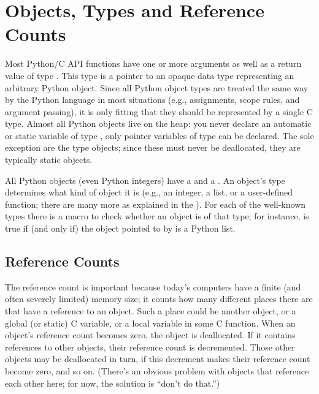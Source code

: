 \documentclass{manual}
\begin{document}
\section{Objects, Types and Reference Counts \label{objects}}

Most Python/C API functions have one or more arguments as well as a
return value of type .  This type is a pointer
to an opaque data type representing an arbitrary Python
object.  Since all Python object types are treated the same way by the
Python language in most situations (e.g., assignments, scope rules,
and argument passing), it is only fitting that they should be
represented by a single C type.  Almost all Python objects live on the
heap: you never declare an automatic or static variable of type
, only pointer variables of type  can 
be declared.  The sole exception are the type objects;
since these must never be deallocated, they are typically static
 objects.

All Python objects (even Python integers) have a  and a
.  An object's type determines what kind of object 
it is (e.g., an integer, a list, or a user-defined function; there are 
many more as explained in the ).  For each of the well-known types there is a macro
to check whether an object is of that type; for instance,
 is true if (and only if) the object
pointed to by  is a Python list.


\subsection{Reference Counts \label{refcounts}}

The reference count is important because today's computers have a 
finite (and often severely limited) memory size; it counts how many 
different places there are that have a reference to an object.  Such a 
place could be another object, or a global (or static) C variable, or 
a local variable in some C function.  When an object's reference count 
becomes zero, the object is deallocated.  If it contains references to 
other objects, their reference count is decremented.  Those other 
objects may be deallocated in turn, if this decrement makes their 
reference count become zero, and so on.  (There's an obvious problem 
with objects that reference each other here; for now, the solution is 
``don't do that.'')
\end{document}
